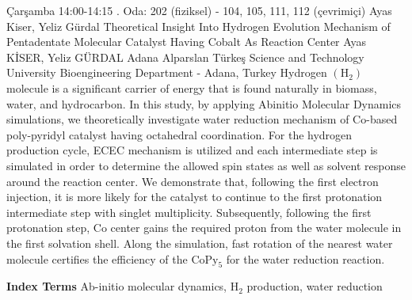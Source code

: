 
    \begin{abstract_basarim}
    {Çarşamba 14:00-14:15}
    {.}
    {Oda: 202 (fiziksel) - 104, 105, 111, 112 (çevrimiçi)}
    {Ayas Kiser, Yeliz Gürdal}
    {Theoretical Insight Into Hydrogen Evolution Mechanism of Pentadentate Molecular Catalyst Having Cobalt As Reaction Center}
    {%
    Ayas KİSER, Yeliz GÜRDAL}
    {%
    }
    {%
    Adana Alparslan Türkeş Science and Technology University Bioengineering Department - Adana, Turkey}
    Hydrogen $\left(\mathrm{H}_{2}\right)$ molecule is a significant carrier of energy that is found naturally in biomass, water, and hydrocarbon. In this study, by applying Abinitio Molecular Dynamics simulations, we theoretically investigate water reduction mechanism of Co-based poly-pyridyl catalyst having octahedral coordination. For the hydrogen production cycle, ECEC mechanism is utilized and each intermediate step is simulated in order to determine the allowed spin states as well as solvent response around the reaction center. We demonstrate that, following the first electron injection, it is more likely for the catalyst to continue to the first protonation intermediate step with singlet multiplicity. Subsequently, following the first protonation step, Co center gains the required proton from the water molecule in the first solvation shell. Along the simulation, fast rotation of the nearest water molecule certifies the efficiency of the $\mathrm{CoPy}_{5}$ for the water reduction reaction. 
    
            \textbf{Index Terms} \newline{}Ab-initio molecular dynamics, $\mathrm{H}_{2}$ production, water reduction
    \end{abstract_basarim}
    